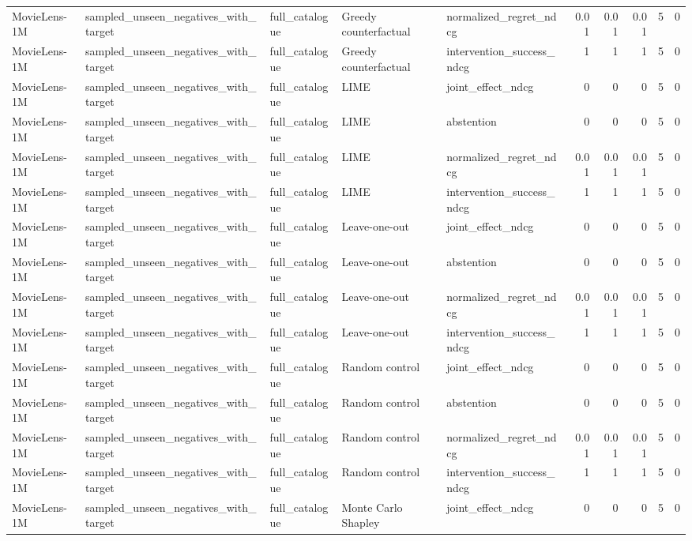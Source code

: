 \begin{table}[t]
{\begin{tabular}{lllllrrrrr}
MovieLens-1M & sampled\_unseen\_negatives\_with\_target & full\_catalogue & Greedy counterfactual & normalized\_regret\_ndcg & 0.01 & 0.01 & 0.01 & 5 & 0 \\
MovieLens-1M & sampled\_unseen\_negatives\_with\_target & full\_catalogue & Greedy counterfactual & intervention\_success\_ndcg & 1 & 1 & 1 & 5 & 0 \\
MovieLens-1M & sampled\_unseen\_negatives\_with\_target & full\_catalogue & LIME & joint\_effect\_ndcg & 0 & 0 & 0 & 5 & 0 \\
MovieLens-1M & sampled\_unseen\_negatives\_with\_target & full\_catalogue & LIME & abstention & 0 & 0 & 0 & 5 & 0 \\
MovieLens-1M & sampled\_unseen\_negatives\_with\_target & full\_catalogue & LIME & normalized\_regret\_ndcg & 0.01 & 0.01 & 0.01 & 5 & 0 \\
MovieLens-1M & sampled\_unseen\_negatives\_with\_target & full\_catalogue & LIME & intervention\_success\_ndcg & 1 & 1 & 1 & 5 & 0 \\
MovieLens-1M & sampled\_unseen\_negatives\_with\_target & full\_catalogue & Leave-one-out & joint\_effect\_ndcg & 0 & 0 & 0 & 5 & 0 \\
MovieLens-1M & sampled\_unseen\_negatives\_with\_target & full\_catalogue & Leave-one-out & abstention & 0 & 0 & 0 & 5 & 0 \\
MovieLens-1M & sampled\_unseen\_negatives\_with\_target & full\_catalogue & Leave-one-out & normalized\_regret\_ndcg & 0.01 & 0.01 & 0.01 & 5 & 0 \\
MovieLens-1M & sampled\_unseen\_negatives\_with\_target & full\_catalogue & Leave-one-out & intervention\_success\_ndcg & 1 & 1 & 1 & 5 & 0 \\
MovieLens-1M & sampled\_unseen\_negatives\_with\_target & full\_catalogue & Random control & joint\_effect\_ndcg & 0 & 0 & 0 & 5 & 0 \\
MovieLens-1M & sampled\_unseen\_negatives\_with\_target & full\_catalogue & Random control & abstention & 0 & 0 & 0 & 5 & 0 \\
MovieLens-1M & sampled\_unseen\_negatives\_with\_target & full\_catalogue & Random control & normalized\_regret\_ndcg & 0.01 & 0.01 & 0.01 & 5 & 0 \\
MovieLens-1M & sampled\_unseen\_negatives\_with\_target & full\_catalogue & Random control & intervention\_success\_ndcg & 1 & 1 & 1 & 5 & 0 \\
MovieLens-1M & sampled\_unseen\_negatives\_with\_target & full\_catalogue & Monte Carlo Shapley & joint\_effect\_ndcg & 0 & 0 & 0 & 5 & 0 \\

\end{tabular}}
\end{table}
